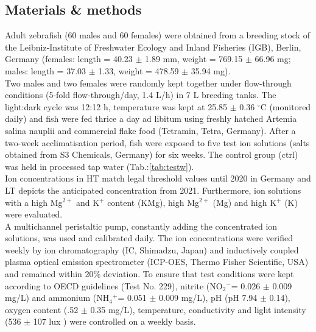 \documentclass[twoside]{article}
\begin{document}
\begin{multicols}{2}
\section{Materials \& methods}
Adult zebrafish (60 males and 60 females) were obtained from a breeding stock of the Leibniz-Institute of Freshwater Ecology and Inland Fisheries (IGB), Berlin, Germany (females: length = 40.23 $\pm$ 1.89 mm, weight = 769.15 $\pm$ 66.96 mg; males: length = 37.03 $\pm$ 1.33, weight = 478.59 $\pm$ 35.94 mg). \\
Two males and two females were randomly kept together under flow-through conditions (5-fold flow-through/day, 1.4 L/h) in 7 L breeding tanks. The light:dark cycle was 12:12 h, temperature was kept at 25.85 $\pm$ 0.36 $^{\circ}$C (monitored daily) and fish were fed thrice a day ad libitum using freshly hatched Artemia salina nauplii and commercial flake food (Tetramin, Tetra, Germany). After a two-week acclimatisation period, fish were exposed to five test ion solutions (salts obtained from S3 Chemicals, Germany) for six weeks. The control group (ctrl) was held in processed tap water (Tab.:\ref{tab:testw}).\\
Ion concentrations in HT match legal threshold values until 2020 in Germany and LT depicts the anticipated concentration from 2021. 
Furthermore, ion solutions with a high Mg$^{2+ }$ and K$^+$ content (KMg),  high Mg$^{2+ }$ (Mg) and high K$^+$ (K) were evaluated. 
\\ A multichannel peristaltic pump, constantly adding the concentrated ion solutions, was used and calibrated daily.  The ion concentrations were verified weekly by ion chromatography (IC, Shimadzu, Japan) and inductively coupled plasma optical emission spectrometer (ICP-OES, Thermo Fisher Scientific, USA) and remained within 20\% deviation. To ensure that test conditions were kept according to OECD guidelines (Test No. 229), nitrite (NO$_2$$^-$= 0.026 $\pm$ 0.009 mg/L) and ammonium (NH$_4$$^+$= 0.051 $\pm$ 0.009 mg/L), pH (pH 7.94 $\pm$ 0.14), oxygen content (.52 $\pm$ 0.35 mg/L), temperature, conductivity and light intensity (536 $\pm$ 107 lux ) were controlled on a weekly basis. 


\end{multicols}
\end{document}
